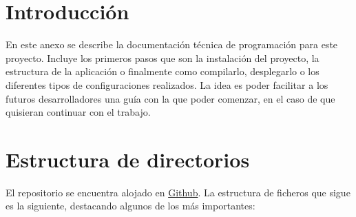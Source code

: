 
\section{Introducción}
En este anexo se describe la documentación técnica de programación para este proyecto. Incluye los primeros pasos que son la instalación del proyecto, la estructura de la aplicación o finalmente como compilarlo, desplegarlo o los diferentes tipos de configuraciones realizados. La idea es poder facilitar a los futuros desarrolladores una guía con la que poder comenzar, en el caso de que quisieran continuar con el trabajo.

\section{Estructura de directorios}
El repositorio se encuentra alojado en \href{https://github.com/scc0034/flutter_serpiente}{Github}. La estructura de ficheros que sigue es la siguiente, destacando algunos de los más importantes:

